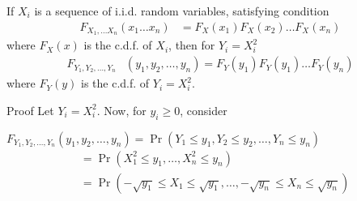 \documentclass{beamer}
\providecommand{\pr}[1]{\ensuremath{\Pr\left(#1\right)}}
\begin{document}
\begin{frame}{}
\begin{lemma} \label{lmacondb}
    If $X_i$ is a sequence of i.i.d. random variables, satisfying condition
    \begin{align}
        F_{X_1,\ldots X_n}(x_1\ldots x_n)&=F_X(x_1)F_X(x_2)\ldots F_X(x_n)\label{maincondnB}
    \end{align} 
    where $F_{X}(x)$ is the c.d.f. of $X_i$, then for $Y_i = X_i^2$
    \begin{align}
    F_{Y_1,Y_2,\dots,Y_n}&(y_1,y_2,\dots,y_n)=F_Y(y_1)F_Y(y_1)\dots F_Y(y_n)
    \end{align}
    where $F_Y(y)$ is the c.d.f. of $Y_i=X_i^2$.
\end{lemma}
\begin{block}{Proof}
Let $Y_i = X_i^2$.
Now, for $y_i\geq0$, consider

\begin{math}
    F_{Y_1,Y_2,\ldots,Y_n}(y_1,y_2,\ldots,y_n)=\pr{Y_1 \leq y_1,Y_2 \leq y_2,\ldots,Y_n \leq y_n}
\end{math}
\begin{align}
    &=\pr{X_1^2 \leq y_1,\ldots,X_n^2 \leq y_n}\\
    &=\pr{-\sqrt{y_1} \leq X_1 \leq \sqrt{y_1},\ldots,-\sqrt{y_n} \leq X_n \leq \sqrt{y_n}}
\end{align}
\end{block}
\end{frame}
\end{document}
